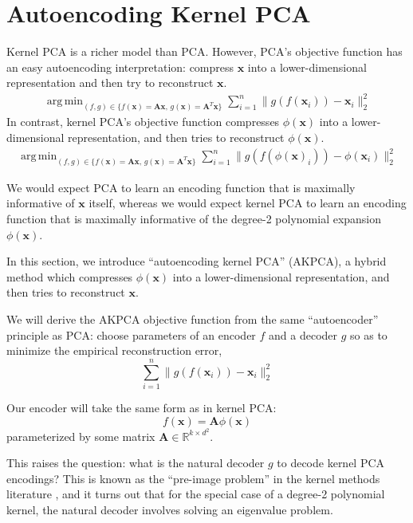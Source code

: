 \documentclass[]{article}
\newcommand{\reals}{\mathbb{R}}
\DeclareMathOperator*{\argmin}{arg\,min}
\begin{document}
\section{Autoencoding Kernel PCA}

Kernel PCA is a richer model than PCA.
However, PCA's objective function has an easy autoencoding interpretation: compress $\mathbf{x}$ into a lower-dimensional representation and then try to reconstruct $\mathbf{x}$.
\begin{align*}
\argmin_{(f, g) \in \{f(\mathbf{x}) = \mathbf{A} \mathbf{x}, \, g(\mathbf{x}) = \mathbf{A}^T \mathbf{x} \}} \sum_{i=1}^n \|g(f(\mathbf{x}_i)) - \mathbf{x}_i \|^2_2 \tag{PCA objective}
\end{align*}
In contrast, kernel PCA's objective function compresses $\phi(\mathbf{x})$ into a lower-dimensional representation, and then tries to reconstruct $\phi(\mathbf{x})$.
\begin{align*}
\argmin_{(f, g) \in \{f(\mathbf{x}) = \mathbf{A} \mathbf{x}, \, g(\mathbf{x}) = \mathbf{A}^T \mathbf{x} \}} \sum_{i=1}^n \|g(f(\phi(\mathbf{x})_i)) - \phi(\mathbf{x}_i) \|^2_2 \tag{kernel PCA objective}
\end{align*}

We would expect PCA to learn an encoding function that is maximally informative of $\mathbf{x}$ itself, whereas we would expect kernel PCA to learn an encoding function that is maximally informative of  the degree-2 polynomial expansion $\phi(\mathbf{x})$.

In this section, we introduce ``autoencoding kernel PCA''  (AKPCA), a hybrid method which compresses $\phi(\mathbf{x})$ into a lower-dimensional representation, and then tries to reconstruct $\mathbf{x}$.

We will derive the AKPCA objective function from the same ``autoencoder'' principle as PCA: choose parameters of an encoder $f$ and a decoder $g$ so as to minimize the empirical reconstruction error,
$$ \sum_{i=1}^n \| g(f(\mathbf{x}_i)) - \mathbf{x}_i \|^2_2 $$

Our encoder will take the same form as in kernel PCA:
$$ f(\mathbf{x}) = \mathbf{A} \phi(\mathbf{x}) $$
parameterized by some matrix $\mathbf{A} \in \reals^{k \times d^2}$.

This raises the question: what is the natural decoder $g$ to decode kernel PCA encodings?
This is known as the ``pre-image problem'' in the kernel methods literature \cite{kwok2003, mika1999}, and it turns out that for the special case of a degree-2 polynomial kernel, the natural decoder involves solving an eigenvalue problem.
\end{document}
